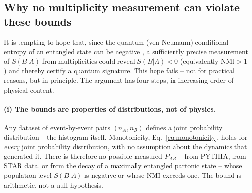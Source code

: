 \documentclass[11pt]{article}
\newcommand{\SBA}{S(B|A)}
\newcommand{\NMI}{\mathrm{NMI}}
\begin{document}
\subsection{Why no multiplicity measurement can violate these bounds}
\label{sec:nogo}

It is tempting to hope that, since the quantum (von Neumann) conditional
entropy of an entangled state can be negative \cite{CerfAdami}, a
sufficiently precise measurement of $\SBA$ from multiplicities could
reveal $\SBA<0$ (equivalently $\NMI>1$) and thereby certify a quantum
signature. This hope fails -- not for practical reasons, but in
principle. The argument has four steps, in increasing order of physical
content.

\paragraph{(i) The bounds are properties of distributions, not of
physics.} Any dataset of event-by-event pairs $(n_A,n_B)$ defines a joint
probability distribution -- the histogram itself. Monotonicity,
Eq.~\eqref{eq:monotonicity}, holds for \emph{every} joint probability
distribution, with no assumption about the dynamics that generated it.
There is therefore no possible measured $P_{AB}$ -- from PYTHIA, from
STAR data, or from the decay of a maximally entangled partonic state --
whose population-level $\SBA$ is negative or whose $\NMI$ exceeds one.
The bound is arithmetic, not a null hypothesis.
\end{document}
